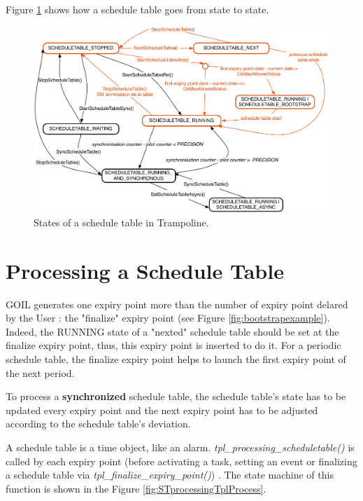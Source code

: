 Figure \ref{fig:STstates} shows how a schedule table goes from state to state.

\begin{figure}[H] %
   \centering
   \includegraphics[width=6in]{pictures/STstates.pdf}  
   \caption{States of a schedule table in Trampoline.}
   \label{fig:STstates}
\end{figure} 
	
\section{Processing a Schedule Table}

GOIL generates one expiry point more than the number of expiry point delared by the User : the "finalize" expiry point (see Figure \ref{fig:bootstrapexample}). Indeed, the RUNNING state of a "nexted" schedule table should be set at the finalize expiry point, thus, this expiry point is inserted to do it. For a periodic schedule table, the finalize expiry point helps to launch the first expiry point of the next period.

To process a \textbf{synchronized} schedule table, the schedule table's state has to be updated every expiry point and the next expiry point has to be adjusted according to the schedule table's deviation.

A schedule table is a time object, like an alarm. \textit{tpl\_processing\_scheduletable()} is called by each expiry point (before activating a task, setting an event or finalizing a schedule table via \textit{tpl\_finalize\_expiry\_point()}) . The state machine of this function is shown in the Figure \ref{fig:STprocessingTplProcess}.

